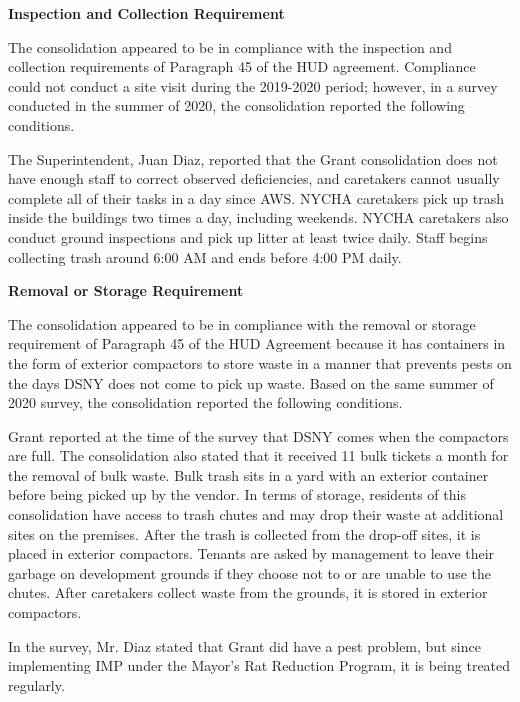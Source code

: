  

\textbf{Inspection and Collection Requirement} 

 

The consolidation appeared to be in compliance with the inspection and collection requirements of Paragraph 45 of the HUD agreement. Compliance could not conduct a site visit during the 2019-2020 period; however, in a survey conducted in the summer of 2020, the consolidation reported the following conditions. 

The Superintendent, Juan Diaz, reported that the Grant consolidation does not have enough staff to correct observed deficiencies, and caretakers cannot usually complete all of their tasks in a day since AWS. NYCHA caretakers pick up trash inside the buildings two times a day, including weekends. NYCHA caretakers also conduct ground inspections and pick up litter at least twice daily. Staff begins collecting trash around 6:00 AM and ends before 4:00 PM daily.

\textbf{Removal or Storage Requirement} 

The consolidation appeared to be in compliance with the removal or storage requirement of Paragraph  45 of the HUD Agreement because it has containers in the form of exterior compactors to store waste in a manner that prevents pests on the days DSNY does not come to pick up waste. Based on the same summer of  2020 survey, the consolidation reported the following conditions.

 

Grant reported at the time of the survey that DSNY comes when the compactors are full. The consolidation also stated that it received 11 bulk tickets a month for the removal of bulk waste.  Bulk trash sits in a yard with an exterior container before being picked up by the vendor. In terms of storage, residents of this consolidation have access to trash chutes and may drop their waste at additional sites on the premises. After the trash is collected from the drop-off sites, it is placed in exterior compactors. Tenants are asked by management to leave their garbage on development grounds if they choose not to or are unable to use the chutes. After caretakers collect waste from the grounds, it is stored in exterior compactors. 

 

In the survey, Mr. Diaz stated that Grant did have a pest problem, but since implementing IMP under the Mayor's Rat Reduction Program, it is being treated regularly. 

